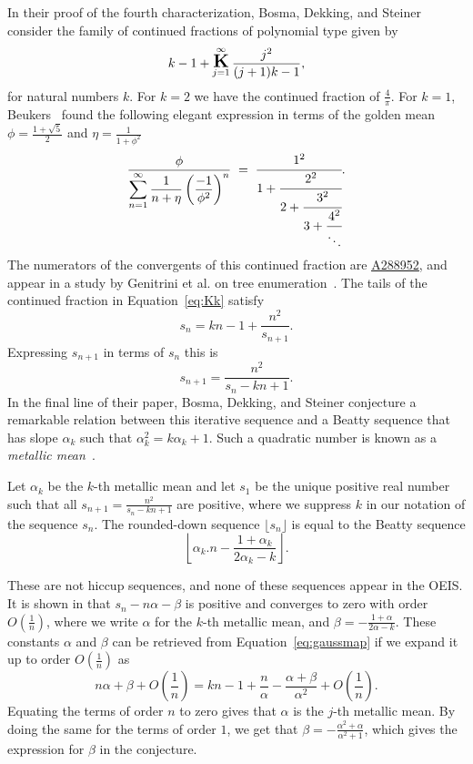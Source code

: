 \documentclass[12pt,reqno]{article}
\newcommand{\seqnum}[1]{\href{https://oeis.org/#1}{\rm \underline{#1}}}
\begin{document}
In their proof of the fourth characterization, Bosma, Dekking, and
Steiner consider the family of continued fractions of polynomial type given by
\begin{equation}\label{eq:Kk}
k-1+\mathop{\mbox{\Large\bfseries K}}\limits_{j=1}^{\infty} \frac{j^2}{(j+1)k-1},
\end{equation}
for natural numbers $k$. 
For $k=2$ we have the continued fraction of $\frac 4\pi$.
For $k=1$, Beukers~\cite{Beukers} found the following
elegant expression in terms of the golden mean $\phi=\frac{1+\sqrt 5}2$
and $\eta=\frac 1{1+\phi^2}$
\begin{equation}\label{eq:n2n}
\frac{\phi}
{\displaystyle \sum_{n=1}^\infty \dfrac 1{n+\eta}\left(\dfrac {-1}{\phi^2}\right)^n}
\;=\;
\cfrac{1^2}{1 + 
\cfrac{2^2}{2 + 
\cfrac{3^2}{3 + 
\cfrac{4^2}{\ddots}}}}.
\end{equation}
The numerators
of the convergents of this continued fraction
are \seqnum{A288952}, and appear in a study by Genitrini et al. on tree enumeration~\cite{genitrini2020}.
The tails of the continued fraction in Equation~\ref{eq:Kk} satisfy
\begin{equation}\label{eq:gaussmap}
s_n=kn-1+\frac {n^2}{s_{n+1}}.
\end{equation}
Expressing $s_{n+1}$ in terms of $s_n$ this is
\[
s_{n+1}=\frac {n^2}{s_{n}-kn+1}.
\]
In the final line of their
paper, Bosma, Dekking, and Steiner conjecture a remarkable relation
between this iterative sequence and a Beatty sequence that has 
slope $\alpha_k$ such that $\alpha_k^2=k\alpha_k+1$.
Such a quadratic number is known as a 
\emph{metallic mean}~\cite{metallic}.

\begin{conjecture}\label{con:bds}
Let $\alpha_k$
be the $k$-th metallic mean and
let $s_1$ be the unique positive real number such that
all $s_{n+1}=\frac{n^2}{s_n-kn+1}$
are positive, where we suppress $k$ in our notation
of the sequence $s_n$. The rounded-down sequence  $\lfloor s_n\rfloor$
is equal to the Beatty sequence \[\left\lfloor \alpha_k.n-\frac{1+\alpha_k}{2\alpha_k-k} \right\rfloor.\]
\end{conjecture}
\vspace{0.5cm}
These are not hiccup sequences, and none of these sequences appear in the OEIS.
It is shown in \cite{bosma2018} that $s_n-n\alpha-\beta$ is positive
and converges to zero with order $O\left(\frac 1n\right)$,  where
we write $\alpha$ for the $k$-th metallic mean, and $\beta=-\frac{1+\alpha}{2\alpha-k}$. These constants $\alpha$
and $\beta$ can be retrieved from Equation~\ref{eq:gaussmap} if we
expand it up to order $O\left(\frac 1n\right)$ as
\[
n\alpha+\beta+O\left(\frac 1 n\right)=kn-1+\frac {n}{\alpha}-\frac{\alpha+\beta}{\alpha^2}+O\left(\frac 1 n\right).
\]
Equating the terms of order $n$ to zero gives that $\alpha$ is the
$j$-th metallic mean. By doing the same for the terms of order $1$,
we get that $\beta=-\frac{\alpha^2+\alpha}{\alpha^2+1}$, which 
gives the expression for $\beta$ in the conjecture.
\end{document}
